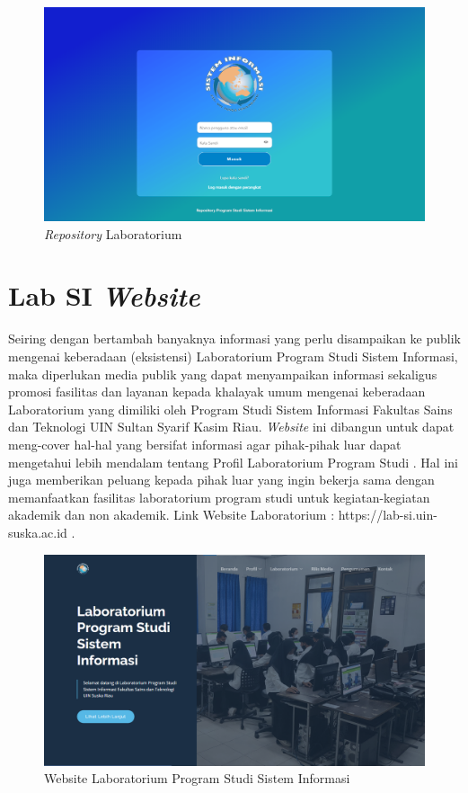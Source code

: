 \begin{figure}
	\centering
	\includegraphics[width=0.82\linewidth]{konten//gambar/sirepo.png}
	\caption{\textit{Repository} Laboratorium \protect\cite{web-prodi}}
	\label{fig:enter-label}
\end{figure}

\section{Lab SI \textit{Website}}
Seiring dengan bertambah banyaknya informasi yang perlu disampaikan ke publik mengenai keberadaan (eksistensi) Laboratorium Program Studi Sistem Informasi, maka diperlukan media publik yang dapat menyampaikan informasi sekaligus promosi fasilitas dan layanan kepada khalayak umum mengenai keberadaan Laboratorium yang dimiliki oleh Program Studi Sistem Informasi Fakultas Sains dan Teknologi UIN Sultan Syarif Kasim Riau. \textit{Website} ini dibangun untuk dapat meng-cover hal-hal yang bersifat informasi agar pihak-pihak luar dapat mengetahui lebih mendalam tentang Profil Laboratorium Program Studi \cite{kusuma2024penerapan}. Hal ini juga memberikan peluang kepada pihak luar yang ingin bekerja sama dengan memanfaatkan fasilitas laboratorium program studi untuk kegiatan-kegiatan akademik dan non akademik.  Link Website Laboratorium : https://lab-si.uin-suska.ac.id \cite{web-prodi}.

\begin{figure}
	\centering
	\includegraphics[width=0.82\linewidth]{konten//gambar/labsi.png}
	\caption{Website Laboratorium Program Studi Sistem Informasi \protect\cite{web-prodi}}
	\label{fig:enter-label}
\end{figure}

